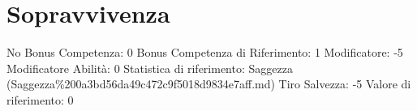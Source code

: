 \section{Sopravvivenza}\label{sopravvivenza}

\begin{description}
\tightlist
\item[Tags: ABI]
No Bonus Competenza: 0 Bonus Competenza di Riferimento: 1 Modificatore:
-5 Modificatore Abilità: 0 Statistica di riferimento: Saggezza
(Saggezza\%200a3bd56da49c472c9f5018d9834e7aff.md) Tiro Salvezza: -5
Valore di riferimento: 0
\end{description}
